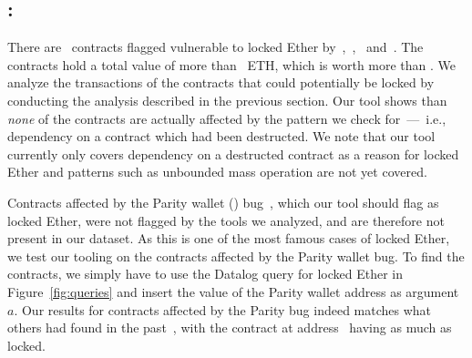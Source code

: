 % 

\subsection{\vle: \lockedether}
\label{ssec:analysis-le}
There are~ contracts flagged vulnerable to locked Ether by~\cite{Tsankov2018},~\cite{Grech2018},~\cite{Nikolic2018a} and~\cite{DBLP:conf/ndss/KalraGDS18}. The contracts hold a total value of more than~ ETH, which is worth more than . We analyze the transactions of the contracts that could potentially be locked by conducting the analysis described in the previous section. Our tool shows than \emph{none} of the contracts are actually affected by the pattern we check for~---~i.e., dependency on a contract which had been destructed.
We note that our tool currently only covers dependency on a destructed contract as a reason for locked Ether and patterns such as unbounded mass operation are not yet covered.

Contracts affected by the Parity wallet () bug~\cite{Breidenbach}, which our tool should flag as locked Ether, were not flagged by the tools we analyzed, and are therefore not present in our dataset.
As this is one of the most famous cases of locked Ether, we test our tooling on the contracts affected by the Parity wallet bug.
To find the contracts, we simply have to use the Datalog query for locked Ether in Figure~\ref{fig:queries} and insert the value of the Parity wallet address as argument $a$. Our results for contracts affected by the Parity bug indeed matches what others had found in the past~\cite{parity-wallet-freeze}, with the contract at address~ having as much as  locked.




